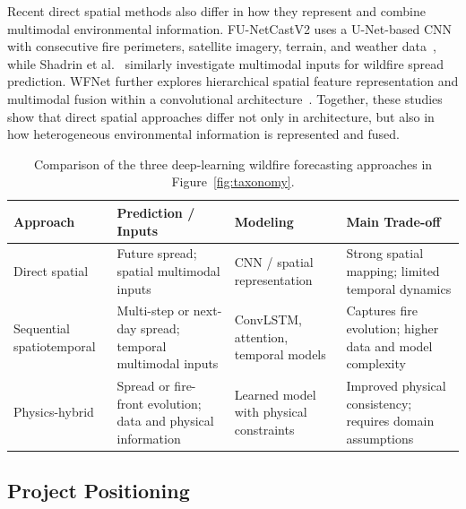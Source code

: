 \documentclass[sigconf]{acmart}
\begin{document}
Recent direct spatial methods also differ in how they represent and combine multimodal environmental information. FU-NetCastV2 uses a U-Net-based CNN with consecutive fire perimeters, satellite imagery, terrain, and weather data~\cite{KHENNOU2023100101}, while Shadrin et al.~\cite{Shadrin_Illarionova_Gubanov_Evteeva_Mironenko_Levchunets_Belousov_Burnaev_2024} similarly investigate multimodal inputs for wildfire spread prediction. WFNet further explores hierarchical spatial feature representation and multimodal fusion within a convolutional architecture~\cite{Jiang_Qiao_Su_Li_Meng_Wu_Quan_Wang_Wang_2023}. Together, these studies show that direct spatial approaches differ not only in architecture, but also in how heterogeneous environmental information is represented and fused.

\begin{table}[!ht]
\centering
\caption{Comparison of the three deep-learning wildfire forecasting approaches in Figure~\ref{fig:taxonomy}.}
\label{tab:comparison}
\vspace{-1em}
\small
\begin{tabular}{@{}p{1.25cm}p{1.65cm}p{1.85cm}p{2.35cm}@{}}
\hline
\textbf{Approach} &
\textbf{Prediction / Inputs} &
\textbf{Modeling} &
\textbf{Main Trade-off} \\ \hline

Direct spatial &
Future spread; spatial multimodal inputs &
CNN / spatial representation &
Strong spatial mapping; limited temporal dynamics \\

Sequential spatiotemporal &
Multi-step or next-day spread; temporal multimodal inputs &
ConvLSTM, attention, temporal models &
Captures fire evolution; higher data and model complexity \\

Physics-hybrid &
Spread or fire-front evolution; data and physical information &
Learned model with physical constraints &
Improved physical consistency; requires domain assumptions \\ \hline

\end{tabular}
\vspace{-1.5em}
\end{table}

\subsection{Project Positioning}
\end{document}
